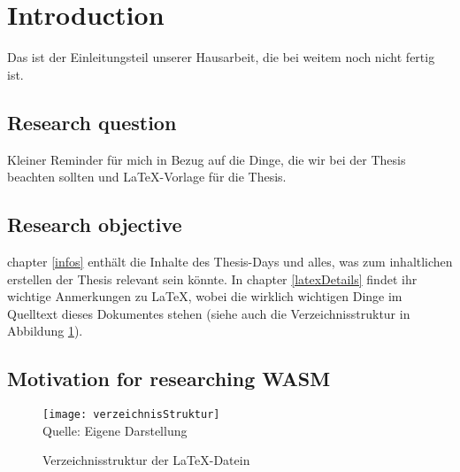\section{Introduction}
Das ist der Einleitungsteil unserer Hausarbeit, die bei weitem noch nicht fertig ist.

\subsection{Research question}
Kleiner Reminder für mich in Bezug auf die Dinge, die wir bei der Thesis beachten sollten und \LaTeX{}-Vorlage für die Thesis.

\subsection{Research objective}
chapter \ref{infos} enthält die Inhalte des Thesis-Days und alles, was zum inhaltlichen erstellen der Thesis relevant sein könnte. In chapter \ref{latexDetails}  findet ihr wichtige Anmerkungen zu \LaTeX{}, wobei die wirklich wichtigen Dinge im Quelltext dieses Dokumentes stehen (siehe auch die Verzeichnisstruktur in Abbildung \ref{fig:verzeichnisStruktur}).

\subsection{Motivation for researching WASM}

\begin{figure}[H]
\caption{Verzeichnisstruktur der \LaTeX{}-Datein}\label{fig:verzeichnisStruktur}
\texttt{[image: verzeichnisStruktur]}
\\
Quelle: Eigene Darstellung
\end{figure}
